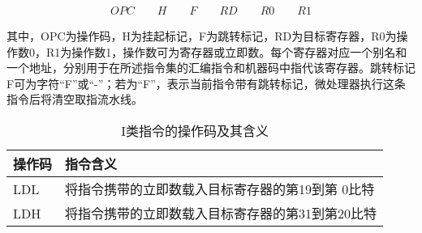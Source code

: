 \begin{align}
    OPC \qquad H \qquad F \qquad RD \qquad R0 \qquad R1
\end{align}

其中，OPC为操作码，H为挂起标记，F为跳转标记，RD为目标寄存器，R0为操作数0，R1为操作数1，操作数可为寄存器或立即数。每个寄存器对应一个别名和一个地址，分别用于在所述指令集的汇编指令和机器码中指代该寄存器。跳转标记F可为字符“F”或“-”；若为“F”，表示当前指令带有跳转标记，微处理器执行这条指令后将清空取指流水线。

\begin{table}
    \centering
    \caption[I类指令的操作码及其含义]{I类指令的操作码及其含义\label{tb:i_instructions}}
    \begin{tabular}{C{2cm}|C{12cm}}
        \toprule
        操作码 & 指令含义 \\
        \midrule
        LDL & 将指令携带的立即数载入目标寄存器的第19到第 0比特\\
        LDH & 将指令携带的立即数载入目标寄存器的第31到第20比特\\
        \bottomrule
    \end{tabular}
\end{table}

